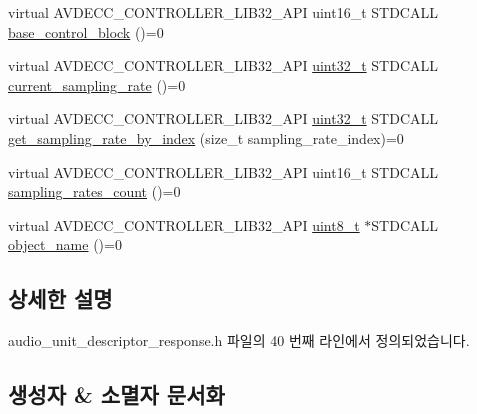 \begin{DoxyCompactItemize}
\item 
virtual A\+V\+D\+E\+C\+C\+\_\+\+C\+O\+N\+T\+R\+O\+L\+L\+E\+R\+\_\+\+L\+I\+B32\+\_\+\+A\+PI uint16\+\_\+t S\+T\+D\+C\+A\+LL \hyperlink{classavdecc__lib_1_1audio__unit__descriptor__response_a81f9751499040fb0f03c1bccb916bc15}{base\+\_\+control\+\_\+block} ()=0
\item 
virtual A\+V\+D\+E\+C\+C\+\_\+\+C\+O\+N\+T\+R\+O\+L\+L\+E\+R\+\_\+\+L\+I\+B32\+\_\+\+A\+PI \hyperlink{parse_8c_a6eb1e68cc391dd753bc8ce896dbb8315}{uint32\+\_\+t} S\+T\+D\+C\+A\+LL \hyperlink{classavdecc__lib_1_1audio__unit__descriptor__response_a115c8f2c1f0bd18abff75088d1932b02}{current\+\_\+sampling\+\_\+rate} ()=0
\item 
virtual A\+V\+D\+E\+C\+C\+\_\+\+C\+O\+N\+T\+R\+O\+L\+L\+E\+R\+\_\+\+L\+I\+B32\+\_\+\+A\+PI \hyperlink{parse_8c_a6eb1e68cc391dd753bc8ce896dbb8315}{uint32\+\_\+t} S\+T\+D\+C\+A\+LL \hyperlink{classavdecc__lib_1_1audio__unit__descriptor__response_afc7a1bf085d4a33f345bed082efd0737}{get\+\_\+sampling\+\_\+rate\+\_\+by\+\_\+index} (size\+\_\+t sampling\+\_\+rate\+\_\+index)=0
\item 
virtual A\+V\+D\+E\+C\+C\+\_\+\+C\+O\+N\+T\+R\+O\+L\+L\+E\+R\+\_\+\+L\+I\+B32\+\_\+\+A\+PI uint16\+\_\+t S\+T\+D\+C\+A\+LL \hyperlink{classavdecc__lib_1_1audio__unit__descriptor__response_a07f5bff31c9d15bb4a2e300ddb5be5b7}{sampling\+\_\+rates\+\_\+count} ()=0
\item 
virtual A\+V\+D\+E\+C\+C\+\_\+\+C\+O\+N\+T\+R\+O\+L\+L\+E\+R\+\_\+\+L\+I\+B32\+\_\+\+A\+PI \hyperlink{stdint_8h_aba7bc1797add20fe3efdf37ced1182c5}{uint8\+\_\+t} $\ast$S\+T\+D\+C\+A\+LL \hyperlink{classavdecc__lib_1_1descriptor__response__base_a133f7774946d80f82b8aaaa4cfbb7361}{object\+\_\+name} ()=0
\end{DoxyCompactItemize}


\subsection{상세한 설명}


audio\+\_\+unit\+\_\+descriptor\+\_\+response.\+h 파일의 40 번째 라인에서 정의되었습니다.



\subsection{생성자 \& 소멸자 문서화}
